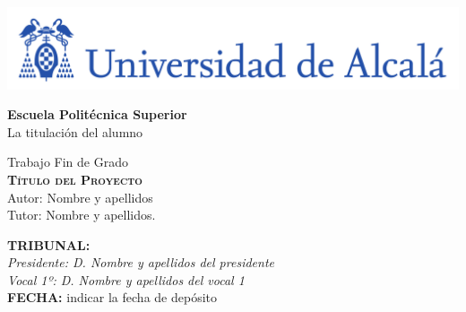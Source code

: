 

\begin{center}

\includegraphics[width=15cm]{figuras/logo-uah.pdf}\\
\vspace{0.5cm}


\LARGE  \textbf{Escuela Politécnica Superior}\\


La titulación del alumno\\
\end{center}

\vspace{0.5cm}



\begin{center}
\vspace{1cm}

\LARGE Trabajo Fin de Grado\\

\textbf{\Huge \textsc{{Título del Proyecto}}}\\
\vspace{0.5cm}
\large Autor: Nombre y apellidos\\
Tutor: Nombre y apellidos.\\
\vspace{0.5cm}
\end{center}

\begin{flushleft}
\textbf{TRIBUNAL:}\\
\vspace{1.5cm}
\textit{Presidente: D. Nombre y apellidos del presidente}\\
\vspace{1.5cm}
\textit{Vocal 1º: D. Nombre y apellidos del vocal 1}\\
\vspace{1.5cm}
\textbf{FECHA:} indicar la fecha de depósito\\ 

\end{flushleft}

\newpage
\thispagestyle{empty}
\hspace*{0.5cm}
\newpage

